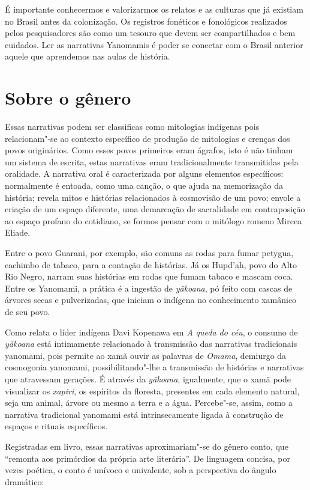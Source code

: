 É importante conhecermos e valorizarmos os relatos e as culturas que já
existiam no Brasil antes da colonização. Os registros fonéticos e
fonológicos realizados pelos pesquisadores são como um tesouro que devem
ser compartilhados e bem cuidados. Ler as narrativas Yanomamis é poder
se conectar com o Brasil anterior aquele que aprendemos nas aulas de
história.

\section{Sobre o gênero}

Essas narrativas podem ser classificas como mitologias indígenas pois relacionam"-se ao contexto específico de produção de mitologias e crenças dos povos originários.
Como esses povos primeiros eram ágrafos, isto é não tinham um sistema de escrita, estas narrativas eram tradicionalmente transmitidas pela oralidade.
A narrativa oral é caracterizada por alguns elementos específicos: normalmente é entoada, como uma canção, o que ajuda na memorização da história; revela mitos e histórias relacionados à cosmovisão de um povo; envole a criação de um espaço diferente, uma demarcação de sacralidade em contraposição ao espaço profano do cotidiano, se formos pensar com o mitólogo romeno Mircea Eliade.

Entre o povo Guarani, por exemplo, são comuns as rodas para fumar petygua, cachimbo de tabaco, para a contação de histórias. Já os Hupd’ah, povo do Alto Rio Negro, narram suas histórias em rodas que fumam tabaco e mascam coca.
Entre os Yanomami, a prática é a ingestão de \textit{yãkoana}, pó feito com cascas de árvores secas e pulverizadas, que iniciam o indígena no conhecimento xamânico de seu povo.

Como relata o líder indígena Davi Kopenawa em \textit{A queda do céu}, o consumo
de \textit{yãkoana} está intimamente relacionado à transmissão das narrativas tradicionais yanomami, pois permite ao xamã ouvir as palavras de \textit{Omama}, demiurgo da cosmogonia yanomami, possibilitando"-lhe a transmissão de histórias e narrativas que atravessam gerações. É através da \textit{yãkoana}, igualmente, que o xamã pode visualizar os \textit{xapiri}, os espíritos da floresta, presentes em cada elemento natural, seja um animal, árvore ou mesmo a terra e a água.
Percebe"-se, assim, como a narrativa tradicional yanomami está intrinsecamente ligada à construção de espaços e rituais específicos.

Registradas em livro, essas narrativas aproximariam"-se do gênero conto,
que ``remonta aos primórdios da própria arte literária''.
De linguagem concisa, por vezes poética, o conto é unívoco e univalente, sob a perspectiva do ângulo dramático:

